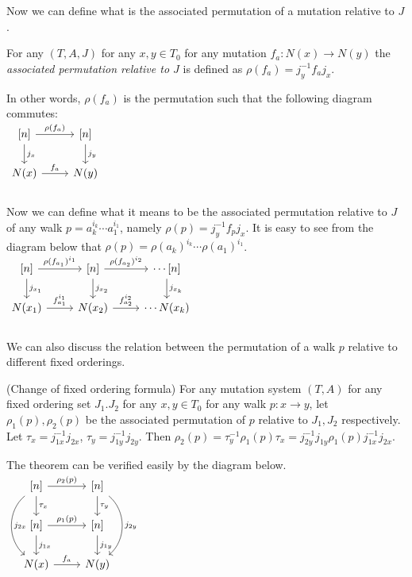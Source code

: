 \indent Now we can define what is the associated permutation of a mutation relative to $J$.\\
\begin{definition}
For any $(T,A,J)$ for any $x,y\in T_0$ for any mutation $f_a:N(x)\to N(y)$ the \textit{associated permutation relative to $J$} is defined as $\rho(f_a)=j_y^{-1}f_aj_x$.
\end{definition}
\indent In other words, $\rho(f_a)$ is the permutation such that the following diagram commutes:\\
$\begin{tikzcd}
{[n]} \arrow[r,"\rho(f_a)"] \arrow[d,"j_x"] & {[n]}\arrow[d,"j_y"]\\
N(x) \arrow[r,"f_a"] & N(y)\\
\end{tikzcd}$\\
\indent Now we can define what it means to be the associated permutation relative to $J$ of any walk $p=a_k^{i_k}\cdots a_1^{i_1}$, namely $\rho(p)=j_y^{-1}f_pj_x$. It is easy to see from the diagram below that $\rho(p)=\rho(a_k)^{i_k}\cdots \rho(a_1)^{i_1}$.\\
$\begin{tikzcd}
{[n]} \arrow[r,"\rho(f_{a_1})^{i_1}"] \arrow[d,"j_{x_1}"] & {[n]}\arrow[r,"\rho(f_{a_2})^{i_2}"]\arrow[d,"j_{x_2}"] & \cdots {[n]}\arrow[d,"j_{x_k}"]\\
N(x_1) \arrow[r,"f_{a_1}^{i_1}"] & N(x_2)\arrow[r,"f_{a_2}^{i_2}"]  & \cdots N(x_k)\\
\end{tikzcd}$\\
\indent We can also discuss the relation between the permutation of a walk $p$ relative to different fixed orderings.\\
\begin{theorem}
(Change of fixed ordering formula) For any mutation system $(T,A)$ for any fixed ordering set $J_1.J_2$ for any $x,y\in T_0$ for any walk $p:x\to y$, let $\rho_1(p),\rho_2(p)$ be the associated permutation of $p$ relative to $J_1,J_2$ respectively. Let $\tau_x=j_{1x}^{-1}j_{2x}$, $\tau_y=j_{1y}^{-1}j_{2y}$. Then $\rho_2(p)=\tau_y^{-1}\rho_1(p)\tau_x=j_{2y}^{-1}j_{1y}\rho_1(p)j_{1x}^{-1}j_{2x}$.\\
\end{theorem}
\indent The theorem can be verified easily by the diagram below.\\
$\begin{tikzcd}
{[n]} \arrow[r,"\rho_2(p)"]\arrow[d,"\tau_x"]\arrow[dd,bend right = 50,"j_{2x}"] & {[n]}\arrow[d,"\tau_y"]\arrow[dd,bend left = 50,"j_{2y}"] \\
{[n]} \arrow[r,"\rho_1(p)"] \arrow[d,"j_{1x}"] & {[n]}\arrow[d,"j_{1y}"]\\
N(x) \arrow[r,"f_a"] & N(y)\\
\end{tikzcd}$\\
